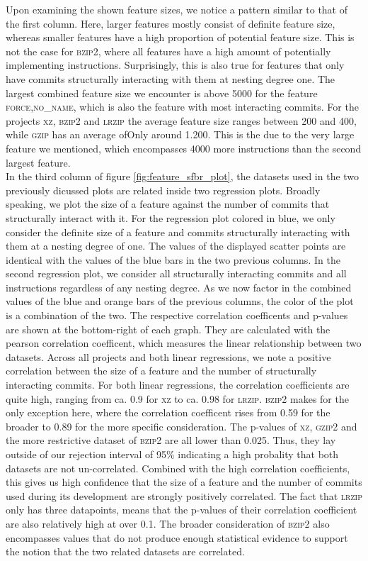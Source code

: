 Upon examining the shown feature sizes, we notice a pattern similar to that of the first column.
Here, larger features mostly consist of definite feature size, whereas smaller features have a high proportion of potential feature size.
This is not the case for \textsc{bzip2}, where all features have a high amount of potentially implementing instructions.
Surprisingly, this is also true for features that only have commits structurally interacting with them at nesting degree one.
The largest combined feature size we encounter is above 5000 for the feature \textsc{force,no\_name}, which is also the feature with most interacting commits.
For the projects \textsc{xz}, \textsc{bzip2} and \textsc{lrzip} the average feature size ranges between 200 and 400, while \textsc{gzip} has an average ofOnly  around 1.200.
This is the due to the very large feature we mentioned, which encompasses 4000 more instructions than the second largest feature. \\
In the third column of figure \ref{fig:feature_sfbr_plot}, the datasets used in the two previously dicussed plots are related inside two regression plots.
Broadly speaking, we plot the size of a feature against the number of commits that structurally interact with it.
For the regression plot colored in blue, we only consider the definite size of a feature and commits structurally interacting with them at a nesting degree of one.
The values of the displayed scatter points are identical with the values of the blue bars in the two previous columns. 
In the second regression plot, we consider all structurally interacting commits and all instructions regardless of any nesting degree.
As we now factor in the combined values of the blue and orange bars of the previous columns, the color of the plot is a combination of the two.
The respective correlation coefficents and p-values are shown at the bottom-right of each graph.
They are calculated with the pearson correlation coefficent, which measures the linear relationship between two datasets.
Across all projects and both linear regressions, we note a positive correlation between the size of a feature and the number of structurally interacting commits.
For both linear regressions, the correlation coefficients are quite high, ranging from ca. 0.9 for \textsc{xz} to ca. 0.98 for \textsc{lrzip}.
\textsc{bzip2} makes for the only exception here, where the correlation coefficent rises from 0.59 for the broader to 0.89 for the more specific consideration.
The p-values of \textsc{xz}, \textsc{gzip2} and the more restrictive dataset of \textsc{bzip2} are all lower than 0.025.
Thus, they lay outside of our rejection interval of 95\% indicating a high probality that both datasets are not un-correlated.
Combined with the high correlation coefficients, this gives us high confidence that the size of a feature and the number of commits used during its development are strongly positively correlated.
The fact that \textsc{lrzip} only has three datapoints, means that the p-values of their correlation coefficient are also relatively high at over 0.1.
The broader consideration of \textsc{bzip2} also encompasses values that do not produce enough statistical evidence to support the notion that the two related datasets are correlated.

